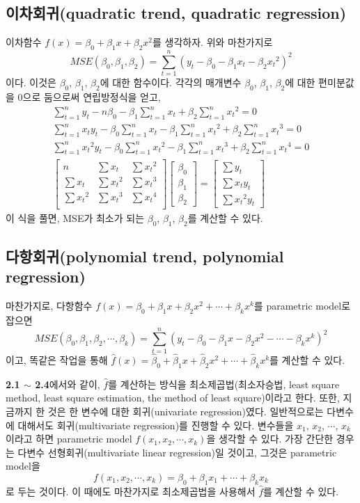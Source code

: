 \documentclass{article}
\begin{document}
\subsection{이차회귀(quadratic trend, quadratic regression)}
이차함수 \(f(x)=\beta_0+\beta_1x+\beta_2x^2\)를 생각하자.
위와 마찬가지로
\[MSE(\beta_0,\beta_1,\beta_2)=\sum_{t=1}^n(y_t-\beta_0-\beta_1{x_t}-\beta_2{x_t}^2)^2\]
이다.
이것은 \(\beta_0\), \(\beta_1\), \(\beta_2\)에 대한 함수이다.
각각의 매개변수 \(\beta_0\), \(\beta_1\), \(\beta_2\)에 대한 편미분값을 0으로 둠으로써 연립방정식을 얻고,
\begin{gather*}
\sum_{t=1}^ny_t-n\beta_0-\beta_1\sum_{t=1}^nx_t+\beta_2\sum_{t=1}^n{x_t}^2=0\\
\sum_{t=1}^nx_ty_t-\beta_0\sum_{t=1}^nx_t-\beta_1\sum_{t=1}^n{x_t}^2+\beta_2\sum_{t=1}^n{x_t}^3=0\\
\sum_{t=1}^n{x_t}^2y_t-\beta_0\sum_{t=1}^n{x_t}^2-\beta_1\sum_{t=1}^n{x_t}^3+\beta_2\sum_{t=1}^n{x_t}^4=0\\
\begin{bmatrix}
n&\sum x_t&\sum{x_t}^2\\
\sum x_t&\sum{x_t}^2&\sum{x_t}^3\\
\sum{x_t}^2&\sum{x_t}^3&\sum{x_t}^4\\
\end{bmatrix}
\begin{bmatrix}
\beta_0\\\beta_1\\\beta_2
\end{bmatrix}
=
\begin{bmatrix}
\sum y_t\\\sum x_ty_t\\\sum{x_t}^2y_t
\end{bmatrix}
\end{gather*}
이 식을 풀면, MSE가 최소가 되는 \(\beta_0\), \(\beta_1\), \(\beta_2\)를 계산할 수 있다.

\subsection{다항회귀(polynomial trend, polynomial regression)}
마찬가지로, 다항함수 \(f(x)=\beta_0+\beta_1x+\beta_2x^2+\cdots+\beta_kx^k\)를 parametric model로 잡으면
\[MSE(\beta_0,\beta_1,\beta_2,\cdots,\beta_k)=\sum_{t=1}^n(y_t-\beta_0-\beta_1x-\beta_2x^2-\cdots-\beta_kx^k)^2\]
이고, 똑같은 작업을 통해 \(\hat f(x)=\hat \beta_0+\hat \beta_1x+\hat \beta_2x^2+\cdots+\hat \beta_kx^k\)를 계산할 수 있다.

\textbf{2.1 \(\sim\) 2.4}에서와 같이, \(\hat f\)를 계산하는 방식을 최소제곱법(최소자승법, least square method, least square estimation, the method of least square)이라고 한다.
또한, 지금까지 한 것은 한 변수에 대한 회귀(univariate regression)였다.
일반적으로는 다변수에 대해서도 회귀(multivariate regression)를 진행할 수 있다.
변수들을 \(x_1\), \(x_2\), \(\cdots\), \(x_k\)이라고 하면 parametric model \(f(x_1,x_2,\cdots,x_k)\)을 생각할 수 있다.
가장 간단한 경우는 다변수 선형회귀(multivariate linear regression)일 것이고, 그것은 parametric model을
\[f(x_1,x_2,\cdots,x_k)=\beta_0+\beta_1x_1+\cdots+\beta_kx_k\]
로 두는 것이다.
이 때에도 마찬가지로 최소제곱법을 사용해서 \(\hat f\)를 계산할 수 있다.
\end{document}
